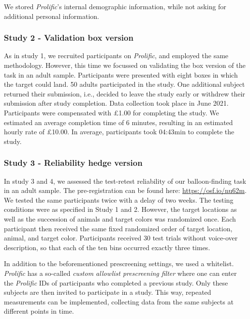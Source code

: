 \documentclass[
  man,floatsintext]{apa6}
\begin{document}
We stored \emph{Prolific}'s internal demographic information, while not asking for additional personal information.

\hypertarget{study-2---validation-box-version}{%
\subsubsection{Study 2 - Validation box version}\label{study-2---validation-box-version}}

As in study 1, we recruited participants on \emph{Prolific}, and employed the same methodology. However, this time we focussed on validating the box version of the task in an adult sample. Participants were presented with eight boxes in which the target could land.
50 adults participated in the study. One additional subject returned their submission, i.e., decided to leave the study early or withdrew their submission after study completion. Data collection took place in June 2021.
Participants were compensated with £1.00 for completing the study. We estimated an average completion time of 6 minutes, resulting in an estimated hourly rate of £10.00. In average, participants took 04:43min to complete the study.

\hypertarget{study-3---reliability-hedge-version}{%
\subsubsection{Study 3 - Reliability hedge version}\label{study-3---reliability-hedge-version}}

In study 3 and 4, we assessed the test-retest reliability of our balloon-finding task in an adult sample. The pre-registration can be found here: \url{https://osf.io/nu62m}. We tested the same participants twice with a delay of two weeks. The testing conditions were as specified in Study 1 and 2. However, the target locations as well as the succession of animals and target colors was randomized once. Each participant then received the same fixed randomized order of target location, animal, and target color. Participants received 30 test trials without voice-over description, so that each of the ten bins occurred exactly three times.

In addition to the beforementioned prescreening settings, we used a whitelist. \emph{Prolific} has a so-called \emph{custom allowlist prescreening filter} where one can enter the \emph{Prolific} IDs of participants who completed a previous study. Only these subjects are then invited to participate in a study. This way, repeated measurements can be implemented, collecting data from the same subjects at different points in time.
\end{document}
